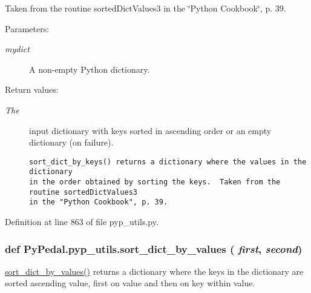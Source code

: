 Taken from the routine sorted\-Dict\-Values3 in the \char`\"{}Python Cookbook\char`\"{}, p. 39. \begin{Desc}
\item[Parameters:]
\begin{description}
\item[{\em mydict}]A non-empty Python dictionary. \end{description}
\end{Desc}
\begin{Desc}
\item[Return values:]
\begin{description}
\item[{\em The}]input dictionary with keys sorted in ascending order or an empty dictionary (on failure).

\footnotesize\begin{verbatim}sort_dict_by_keys() returns a dictionary where the values in the dictionary
in the order obtained by sorting the keys.  Taken from the routine sortedDictValues3
in the "Python Cookbook", p. 39.
\end{verbatim}
\normalsize
 \end{description}
\end{Desc}


Definition at line 863 of file pyp\_\-utils.py.\hypertarget{namespacePyPedal_1_1pyp__utils_b306c118d7e74b6e8b7870cb6c02aaa6}{
\subsubsection[sort\_\-dict\_\-by\_\-values]{\setlength{\rightskip}{0pt plus 5cm}def Py\-Pedal.pyp\_\-utils.sort\_\-dict\_\-by\_\-values ( {\em first},  {\em second})}}
\label{namespacePyPedal_1_1pyp__utils_b306c118d7e74b6e8b7870cb6c02aaa6}


\hyperlink{namespacePyPedal_1_1pyp__utils_b306c118d7e74b6e8b7870cb6c02aaa6}{sort\_\-dict\_\-by\_\-values()} returns a dictionary where the keys in the dictionary are sorted ascending value, first on value and then on key within value. 

